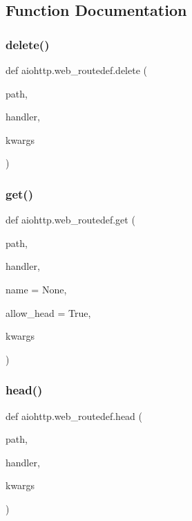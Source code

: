 \subsection{Function Documentation}
\mbox{\label{namespaceaiohttp_1_1web__routedef_ad024cd501fd403282fe516c2a14a2238}} 
\subsubsection{\texorpdfstring{delete()}{delete()}}
{\footnotesize\ttfamily def aiohttp.\+web\+\_\+routedef.\+delete (\begin{DoxyParamCaption}\item[{}]{path,  }\item[{}]{handler,  }\item[{}]{kwargs }\end{DoxyParamCaption})}

\mbox{\label{namespaceaiohttp_1_1web__routedef_a82f495c68cd2369f66dc36a2a27bf654}} 
\subsubsection{\texorpdfstring{get()}{get()}}
{\footnotesize\ttfamily def aiohttp.\+web\+\_\+routedef.\+get (\begin{DoxyParamCaption}\item[{}]{path,  }\item[{}]{handler,  }\item[{}]{name = {\ttfamily None},  }\item[{}]{allow\+\_\+head = {\ttfamily True},  }\item[{}]{kwargs }\end{DoxyParamCaption})}

\mbox{\label{namespaceaiohttp_1_1web__routedef_ae3263e1ab1b4e549fff8469842f865cb}} 
\subsubsection{\texorpdfstring{head()}{head()}}
{\footnotesize\ttfamily def aiohttp.\+web\+\_\+routedef.\+head (\begin{DoxyParamCaption}\item[{}]{path,  }\item[{}]{handler,  }\item[{}]{kwargs }\end{DoxyParamCaption})}

